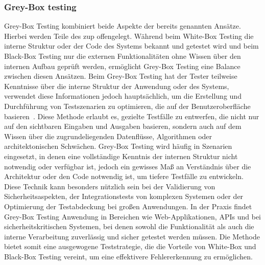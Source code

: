 \subsubsection{Grey-Box testing}\label{subsubsec:grey-box-testing}
Grey-Box Testing kombiniert beide Aspekte der bereits genannten Ansätze.
Hierbei werden Teile des \gls{zup} offengelegt.
Während beim White-Box Testing die interne Struktur oder der Code des Systems bekannt und getestet wird und beim Black-Box
Testing nur die externen Funktionalitäten ohne Wissen über den internen Aufbau geprüft werden,
ermöglicht Grey-Box Testing eine Balance zwischen diesen Ansätzen.
Beim Grey-Box Testing hat der Tester teilweise Kenntnisse über die interne Struktur der Anwendung oder des Systems,
verwendet diese Informationen jedoch hauptsächlich, um die Erstellung und Durchführung von Testszenarien zu optimieren,
die auf der Benutzeroberfläche basieren~\cite{Coulter2001GrayboxST}.
Diese Methode erlaubt es, gezielte Testfälle zu entwerfen, die nicht nur auf den sichtbaren Eingaben und Ausgaben basieren,
sondern auch auf dem Wissen über die zugrundeliegenden Datenflüsse, Algorithmen oder architektonischen Schwächen.
Grey-Box Testing wird häufig in Szenarien eingesetzt, in denen eine vollständige Kenntnis der internen Struktur nicht
notwendig oder verfügbar ist, jedoch ein gewisses Maß an Verständnis über die Architektur oder den Code notwendig ist,
um tiefere Testfälle zu entwickeln.
Diese Technik kann besonders nützlich sein bei der Validierung von Sicherheitsaspekten, der Integrationstests von komplexen
Systemen oder der Optimierung der Testabdeckung bei großen Anwendungen.
In der Praxis findet Grey-Box Testing Anwendung in Bereichen wie Web-Applikationen, APIs und bei sicherheitskritischen
Systemen, bei denen sowohl die Funktionalität als auch die interne Verarbeitung zuverlässig und sicher getestet werden müssen.
Die Methode bietet somit eine ausgewogene Teststrategie, die die Vorteile von White-Box und Black-Box Testing vereint,
um eine effektivere Fehlererkennung zu ermöglichen.